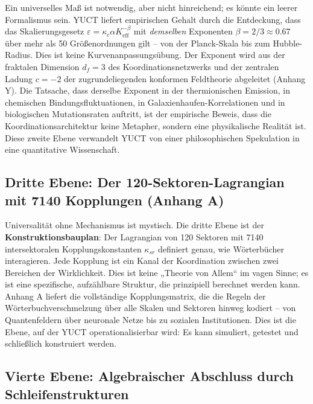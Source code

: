 \documentclass[12pt,a4paper]{article}
\newcommand{\Keff}{K_{\mathrm{eff}}}
\begin{document}
Ein universelles Maß ist notwendig, aber nicht hinreichend; es könnte ein leerer Formalismus sein. YUCT liefert empirischen Gehalt durch die Entdeckung, dass das Skalierungsgesetz \(\varepsilon = \kappa_c \alpha \Keff^{-\beta}\) mit \emph{demselben} Exponenten \(\beta = 2/3 \approx 0.67\) über mehr als 50 Größenordnungen gilt – von der Planck-Skala bis zum Hubble-Radius. Dies ist keine Kurvenanpassungsübung. Der Exponent wird aus der fraktalen Dimension \(d_f = 3\) des Koordinationsnetzwerks und der zentralen Ladung \(c = -2\) der zugrundeliegenden konformen Feldtheorie abgeleitet (Anhang Y). Die Tatsache, dass derselbe Exponent in der thermionischen Emission, in chemischen Bindungsfluktuationen, in Galaxienhaufen-Korrelationen und in biologischen Mutationsraten auftritt, ist der empirische Beweis, dass die Koordinationsarchitektur keine Metapher, sondern eine physikalische Realität ist. Diese zweite Ebene verwandelt YUCT von einer philosophischen Spekulation in eine quantitative Wissenschaft.

\subsection{Dritte Ebene: Der 120-Sektoren-Lagrangian mit 7140 Kopplungen (Anhang A)}

Universalität ohne Mechanismus ist mystisch. Die dritte Ebene ist der \textbf{Konstruktionsbauplan}: Der Lagrangian von 120 Sektoren mit 7140 intersektoralen Kopplungskonstanten \(\kappa_{sr}\) definiert genau, wie Wörterbücher interagieren. Jede Kopplung ist ein Kanal der Koordination zwischen zwei Bereichen der Wirklichkeit. Dies ist keine „Theorie von Allem“ im vagen Sinne; es ist eine spezifische, aufzählbare Struktur, die prinzipiell berechnet werden kann. Anhang A liefert die vollständige Kopplungsmatrix, die die Regeln der Wörterbuchverschmelzung über alle Skalen und Sektoren hinweg kodiert – von Quantenfeldern über neuronale Netze bis zu sozialen Institutionen. Dies ist die Ebene, auf der YUCT operationalisierbar wird: Es kann simuliert, getestet und schließlich konstruiert werden.

\subsection{Vierte Ebene: Algebraischer Abschluss durch Schleifenstrukturen}
\end{document}
